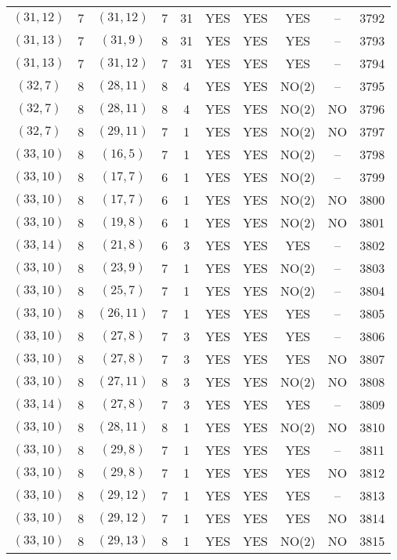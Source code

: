 \begin{longtable}{|c|c|c|c|c|c|c|c|c|c|}
$(31, 12)$ & 7 & $(31, 12)$ & 7 & 31 & YES & YES & YES & -- & 3792\\
$(31, 13)$ & 7 & $(31, 9)$ & 8 & 31 & YES & YES & YES & -- & 3793\\
$(31, 13)$ & 7 & $(31, 12)$ & 7 & 31 & YES & YES & YES & -- & 3794\\
$(32, 7)$ & 8 & $(28, 11)$ & 8 & 4 & YES & YES & NO(2) & -- & 3795\\
$(32, 7)$ & 8 & $(28, 11)$ & 8 & 4 & YES & YES & NO(2) & NO & 3796\\
$(32, 7)$ & 8 & $(29, 11)$ & 7 & 1 & YES & YES & NO(2) & NO & 3797\\
$(33, 10)$ & 8 & $(16, 5)$ & 7 & 1 & YES & YES & NO(2) & -- & 3798\\
$(33, 10)$ & 8 & $(17, 7)$ & 6 & 1 & YES & YES & NO(2) & -- & 3799\\
$(33, 10)$ & 8 & $(17, 7)$ & 6 & 1 & YES & YES & NO(2) & NO & 3800\\
$(33, 10)$ & 8 & $(19, 8)$ & 6 & 1 & YES & YES & NO(2) & NO & 3801\\
$(33, 14)$ & 8 & $(21, 8)$ & 6 & 3 & YES & YES & YES & -- & 3802\\
$(33, 10)$ & 8 & $(23, 9)$ & 7 & 1 & YES & YES & NO(2) & -- & 3803\\
$(33, 10)$ & 8 & $(25, 7)$ & 7 & 1 & YES & YES & NO(2) & -- & 3804\\
$(33, 10)$ & 8 & $(26, 11)$ & 7 & 1 & YES & YES & YES & -- & 3805\\
$(33, 10)$ & 8 & $(27, 8)$ & 7 & 3 & YES & YES & YES & -- & 3806\\
$(33, 10)$ & 8 & $(27, 8)$ & 7 & 3 & YES & YES & YES & NO & 3807\\
$(33, 10)$ & 8 & $(27, 11)$ & 8 & 3 & YES & YES & NO(2) & NO & 3808\\
$(33, 14)$ & 8 & $(27, 8)$ & 7 & 3 & YES & YES & YES & -- & 3809\\
$(33, 10)$ & 8 & $(28, 11)$ & 8 & 1 & YES & YES & NO(2) & NO & 3810\\
$(33, 10)$ & 8 & $(29, 8)$ & 7 & 1 & YES & YES & YES & -- & 3811\\
$(33, 10)$ & 8 & $(29, 8)$ & 7 & 1 & YES & YES & YES & NO & 3812\\
$(33, 10)$ & 8 & $(29, 12)$ & 7 & 1 & YES & YES & YES & -- & 3813\\
$(33, 10)$ & 8 & $(29, 12)$ & 7 & 1 & YES & YES & YES & NO & 3814\\
$(33, 10)$ & 8 & $(29, 13)$ & 8 & 1 & YES & YES & NO(2) & NO & 3815\\

\end{longtable}

